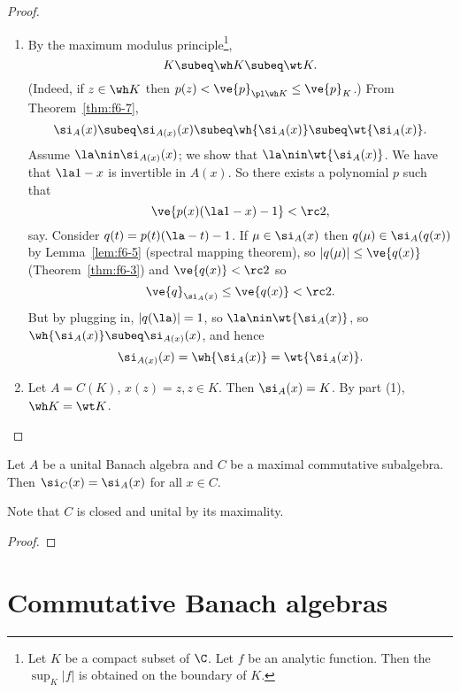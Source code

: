 \begin{proof}
\begin{enumerate}
\item
By the maximum modulus principle\footnote{Let $K$ be a compact subset of $\C$. Let $f$ be an analytic function. Then the $\sup_K|f|$ is obtained on the boundary of $K$.}, 
\[
K\subeq \wh K\subeq \wt K.
\]
(Indeed, if $z\in \wh K$ then $p(z)<\ve{p}_{\pl \wh K}\le \ve{p}_{K}$.)
From Theorem~\ref{thm:f6-7},
\[
\si_{A}(x)\subeq \si_{A(x)}(x)\subeq\wh{\si_A(x)}\subeq \wt{\si_A(x)}.
\]
Assume $\la \nin \si_{A(x)}(x)$; we show that $\la\nin \wt{\si_A(x)}$. We have that $\la 1-x$ is invertible in $A(x)$. So there exists a polynomial $p$ such that \[\ve{p(x)(\la1-x)-1}<\rc 2,\] say. Consider $q(t)=p(t)(\la-t)-1$. If $\mu\in \si_A(x)$ then $q(\mu)\in \si_A(q(x))$ by Lemma~\ref{lem:f6-5} (spectral mapping theorem), so $|q(\mu)|\le \ve{q(x)}$ (Theorem~\ref{thm:f6-3}) and $\ve{q(x)}<\rc 2$ so \[\ve{q}_{\si_A(x)}\le\ve{q(x)}<\rc 2.\] But by plugging in, $|q(\la)|=1$, so $\la \nin \wt{\si_A(x)}$, so $\wh{\si_A(x)}\subeq \si_{A(x)}(x)$, and hence 
\[\si_{A(x)}(x)=\wh{\si_A(x)}=\wt{\si_A(x)}.\]

\item Let $A=C(K)$, $x(z)=z, z\in K$. Then $\si_A(x)=K$. By part (1), $\wh K=\wt K$.
\end{enumerate}
\end{proof}
\begin{pr}
Let $A$ be a unital Banach algebra and $C$ be a maximal commutative subalgebra. Then $\si_C(x)=\si_A(x)$ for all $x\in C$.
\end{pr}
Note that $C$ is closed and unital by its maximality.
\begin{proof}
\end{proof}

\section{Commutative Banach algebras}
